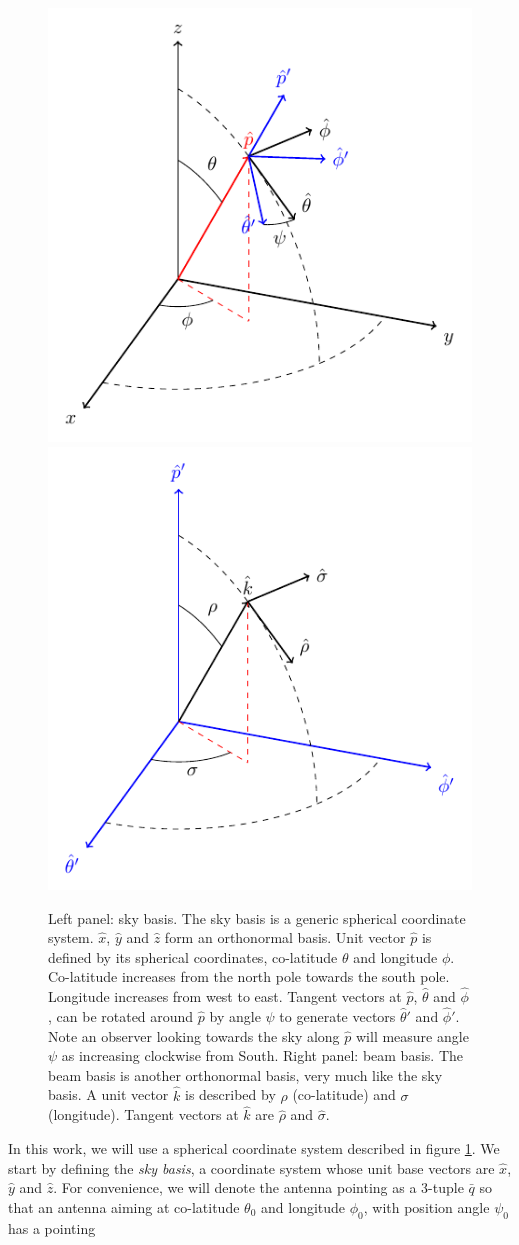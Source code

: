 \documentclass[a4paper,fleqn]{cas-dc}\sloppy
\begin{document}
\begin{figure}
	\centering
	\includegraphics[width=0.43\linewidth]{tikz/sky_basis}	
	\includegraphics[width=0.43\linewidth]{tikz/beam_basis}
	\caption{Left panel: sky basis. The sky basis is a generic spherical coordinate system. $\hat{x}$, $\hat{y}$ and $\hat{z}$ form an orthonormal basis. Unit vector $\hat{p}$ is defined by its spherical coordinates, co-latitude $\theta$ and longitude $\phi$. Co-latitude increases from the north pole towards the south pole. Longitude increases from west to east. Tangent vectors at $\hat{p}$, $\hat{\theta}$ and $\hat{\phi}$, can be rotated around $\hat{p}$ by angle $\psi$ to generate vectors $\hat{\theta}'$ and $\hat{\phi}'$. Note an observer looking towards the sky along $\hat{p}$ will measure angle $\psi$ as increasing clockwise from South. Right panel: beam basis. The beam basis is another orthonormal basis, very much like the sky basis. A unit vector $\hat{k}$ is described by $\rho$ (co-latitude) and $\sigma$ (longitude). Tangent vectors at $\hat{k}$ are $\hat{\rho}$ and $\hat{\sigma}$. }
	\label{fig::sky_basis} 
\end{figure}

In this work, we will use a spherical coordinate system described in figure \ref{fig::sky_basis}. We start by defining the \textsl{sky basis}, a coordinate system whose unit base vectors are $\hat{x}$, $\hat{y}$ and $\hat{z}$. For convenience, we will denote the antenna pointing as a 3-tuple $\bar{q}$ so that an antenna aiming at co-latitude $\theta_0$ and longitude $\phi_0$, with position angle $\psi_0$ has a pointing 
\end{document}
